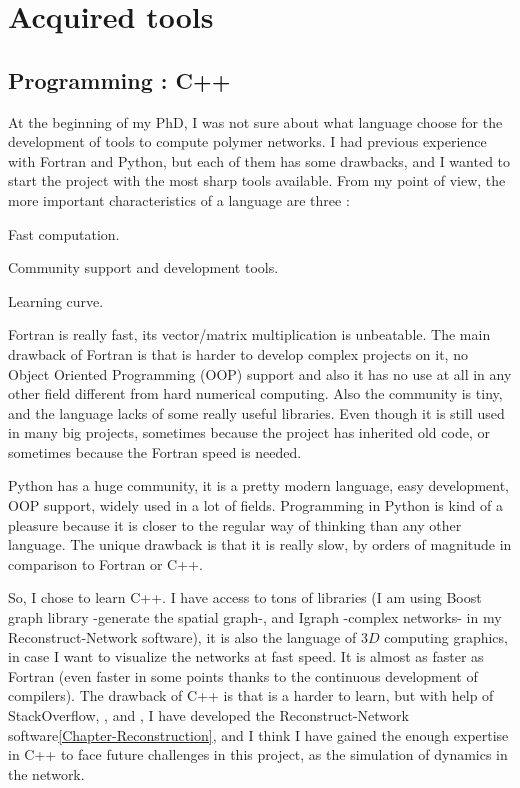 
\chapter{Acquired tools} %

\label{Appendix-tools} %


\section{Programming : C++}
At the beginning of my PhD, I was not sure about what language choose for the
development of tools to compute polymer networks. I had previous experience with
Fortran and Python, but each of them has some drawbacks, and I wanted to start
the project with the most sharp tools available. From my point of
view, the more important characteristics of a language are three :
\begin{enumerate*}[label=\bfseries\alph*)]
\item Fast computation. 
\item Community support and development tools.
\item Learning curve.
\end{enumerate*}
 
Fortran is really fast, its vector/matrix multiplication is unbeatable. The main
drawback of Fortran is that is harder to develop complex projects on it, no
Object Oriented Programming (OOP) support and also it has no use at all in any
other field different from hard numerical computing. Also the community is
tiny, and the language lacks of some really useful libraries.
Even though it is still used in many big projects, sometimes because the project has inherited old code,
 or sometimes because the Fortran speed is needed. 

Python has a huge community, it is a pretty modern language, easy development,
OOP support, widely used in a lot of fields. Programming in Python is kind of a
pleasure because it is closer to the regular way of thinking than any other
language. The unique drawback is that it is really slow, by orders of magnitude
in comparison to Fortran or C++. 

So, I chose to learn C++. I have access to tons of libraries (I am using
Boost graph library -generate the spatial graph-, and Igraph -complex networks-
in my Reconstruct-Network software), it is also the language of $3D$  computing
graphics, in case I want to visualize the networks at fast speed.  It is almost
as faster as Fortran (even faster in some points thanks to the continuous
development of compilers). The drawback of C++ is that is a harder to learn, but
with help of StackOverflow, \citet{stroustrup_c++_2013}, and
\citet{lippman_c++_2012}, I have developed the Reconstruct-Network
software\ref{Chapter-Reconstruction}, and I think I have gained the enough
expertise in C++ to face future challenges in this project, as the simulation of
dynamics in the network.


